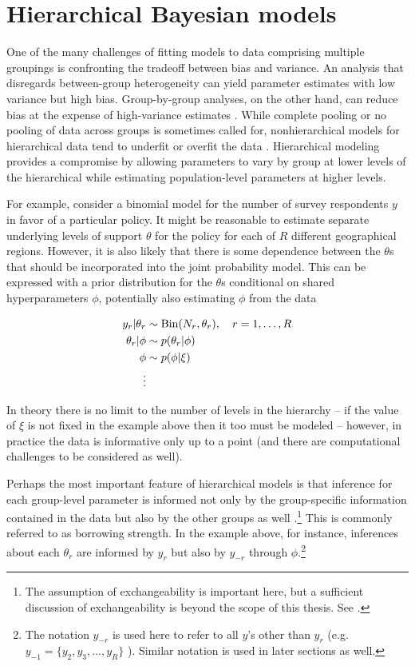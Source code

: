 \section{Hierarchical Bayesian models}
\label{hierarchical}

One of the many challenges of fitting models to data comprising multiple groupings is confronting the tradeoff between bias and variance. An analysis that disregards between-group heterogeneity can yield parameter estimates with low variance but high bias. Group-by-group analyses, on the other hand, can reduce bias at the expense of high-variance estimates . While complete pooling or no pooling of data across groups is sometimes called for, nonhierarchical models for hierarchical data tend to underfit or overfit the data . Hierarchical modeling provides a compromise by allowing parameters to vary by group at lower levels of the hierarchical while estimating population-level parameters at higher levels. 

For example, consider a binomial model for the number of survey respondents $y$ in favor of a particular policy. It might be reasonable to estimate separate underlying levels of support $\theta$ for the policy for each of $R$ different geographical regions. However, it is also likely that there is some dependence between the $\theta$s that should be incorporated into the joint probability model. This can be expressed with a prior distribution for the $\theta$s conditional on shared hyperparameters $\phi$, potentially also estimating $\phi$ from the data 

\begin{align*}
y_r | \theta_r &\sim {\rm Bin}(N_r, \theta_r), \quad r = 1, \dots, R \\
\theta_r  | \phi &\sim p(\theta_r | \phi) \\
\phi & \sim p(\phi | \xi)  \\
\vdots
\end{align*}

In theory there is no limit to the number of levels in the hierarchy -- if the value of $\xi$ is not fixed in the example above then it too must be modeled -- however, in practice the data is informative only up to a point (and there are computational challenges to be considered as well). 

Perhaps the most important feature of hierarchical models is that inference for each group-level parameter is informed not only by the group-specific information contained in the data but also by the other groups as well .\footnote{The assumption of exchangeability is important here, but a sufficient discussion of exchangeability is beyond the scope of this thesis. See .} This is commonly referred to as borrowing strength. In the example above, for instance, inferences about each $\theta_r$ are informed by $y_r$ but also by $y_{-r}$ through $\phi$.\footnote{The notation $y_{-r}$ is used here to refer to all $y$'s other than $y_r$ (e.g. $y_{-1} =  \{y_2, y_3, \dots, y_R\}$ ). Similar notation is used in later sections as well. } 

